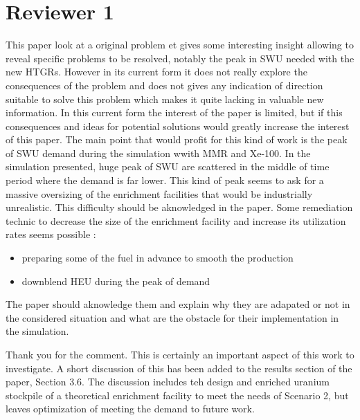 \documentclass[answers,11pt]{exam}
\begin{document}
\section*{Reviewer 1}
\begin{questions}

        \question This paper look at a original problem et gives some 
        interesting insight allowing to reveal specific problems to be resolved, 
        notably the peak in SWU needed with the new HTGRs. However in its 
        current form it does not really explore the consequences of the problem 
        and does not gives any indication of direction suitable to solve this 
        problem which makes it quite lacking in valuable new information.
        In this current form the interest of the paper is limited, but if this 
        consequences and ideas for potential solutions would greatly increase 
        the interest of this paper. The main point that would profit for this 
        kind of work is the peak of SWU demand during the simulation wwith MMR 
        and Xe-100. In the simulation presented, huge peak of SWU are scattered 
        in the middle of time period where the demand is far lower. This kind of 
        peak seems to ask for a massive oversizing of the enrichment facilities 
        that would be industrially unrealistic. This difficulty should be 
        aknowledged in the paper. Some remediation technic to decrease the 
        size of the enrichment facility and increase its utilization rates seems 
        possible :
        \begin{itemize}
                \item preparing some of the fuel in advance to smooth the production
                \item downblend HEU during the peak of demand 
        \end{itemize}
        The paper should aknowledge them and explain why they are adapated or 
        not in the considered situation and what are the obstacle for their 
        implementation in the simulation.
        \begin{solution}
                Thank you for the comment. This is certainly an important aspect of 
                this work to investigate. A short discussion of this has been added 
                to the results section of the paper, Section 3.6. The discussion includes 
                teh design and enriched uranium stockpile of a theoretical enrichment 
                facility to meet the needs of Scenario 2,
                but leaves optimization of meeting the demand to future work. 
        \end{solution}


\end{questions}
\end{document}
